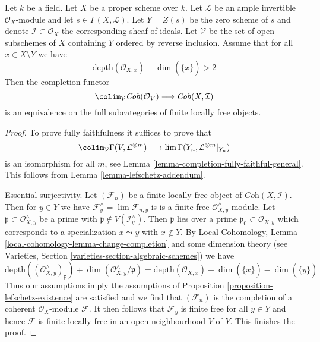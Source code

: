 \begin{proposition}
\label{proposition-lefschetz-equivalence}
Let $k$ be a field. Let $X$ be a proper scheme over $k$.
Let $\mathcal{L}$ be an ample invertible $\mathcal{O}_X$-module
and let $s \in \Gamma(X, \mathcal{L})$. Let $Y = Z(s)$
be the zero scheme of $s$ and denote $\mathcal{I} \subset \mathcal{O}_X$
the corresponding sheaf of ideals.
Let $\mathcal{V}$ be the set of open subschemes of $X$ containing $Y$
ordered by reverse inclusion.
Assume that for all $x \in X \setminus Y$ we have
$$
\text{depth}(\mathcal{O}_{X, x}) + \dim(\overline{\{x\}}) > 2
$$
Then the completion functor
$$
\colim_\mathcal{V}
\textit{Coh}(\mathcal{O}_V)
\longrightarrow
\textit{Coh}(X, \mathcal{I})
$$
is an equivalence on the full subcategories of finite locally free objects.
\end{proposition}

\begin{proof}
To prove fully faithfulness it suffices to prove that
$$
\colim_\mathcal{V} \Gamma(V, \mathcal{L}^{\otimes m})
\longrightarrow
\lim \Gamma(Y_n, \mathcal{L}^{\otimes m}|_{Y_n})
$$
is an isomorphism for all $m$, see
Lemma \ref{lemma-completion-fully-faithful-general}.
This follows from Lemma \ref{lemma-lefschetz-addendum}.

\medskip\noindent
Essential surjectivity. Let $(\mathcal{F}_n)$ be a finite locally
free object of $\textit{Coh}(X, \mathcal{I})$. Then for $y \in Y$ we have
$\mathcal{F}_y^\wedge = \lim \mathcal{F}_{n, y}$ is
is a finite free $\mathcal{O}_{X, y}^\wedge$-module.
Let $\mathfrak p \subset \mathcal{O}_{X, y}^\wedge$
be a prime with $\mathfrak p \not \in V(\mathcal{I}_y^\wedge)$.
Then $\mathfrak p$ lies over a prime $\mathfrak p_0 \subset \mathcal{O}_{X, y}$
which corresponds to a specialization $x \leadsto y$ with
$x \not \in Y$. By Local Cohomology, Lemma
\ref{local-cohomology-lemma-change-completion}
and some dimension theory
(see Varieties, Section \ref{varieties-section-algebraic-schemes})
we have
$$
\text{depth}((\mathcal{O}_{X, y}^\wedge)_\mathfrak p) +
\dim(\mathcal{O}_{X, y}^\wedge/\mathfrak p) =
\text{depth}(\mathcal{O}_{X, x}) +
\dim(\overline{\{x\}}) - \dim(\overline{\{y\}})
$$
Thus our assumptions imply the assumptions of
Proposition \ref{proposition-lefschetz-existence}
are satisfied and we find that $(\mathcal{F}_n)$
is the completion of a coherent $\mathcal{O}_X$-module $\mathcal{F}$.
It then follows that $\mathcal{F}_y$ is finite free for all $y \in Y$
and hence $\mathcal{F}$ is finite locally free in an open
neighbourhood $V$ of $Y$. This finishes the proof.
\end{proof}















